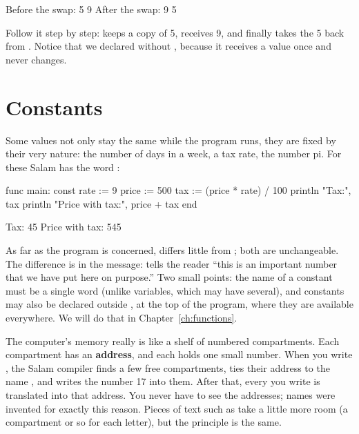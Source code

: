 \begin{salamout}
Before the swap: 5 9
After the swap: 9 5
\end{salamout}

Follow it step by step:  keeps a copy of 5,  receives 9,
and finally  takes the 5 back from . Notice that we
declared  without , because it receives a value once
and never changes.

\section{Constants}

Some values not only stay the same while the program runs, they are fixed by
their very nature: the number of days in a week, a tax rate, the number pi.
For these Salam has the word :

\begin{salamcode}
func main:
    const rate := 9
    price := 500
    tax := (price * rate) / 100
    println "Tax:", tax
    println "Price with tax:", price + tax
end
\end{salamcode}

\begin{salamout}
Tax: 45
Price with tax: 545
\end{salamout}

As far as the program is concerned,  differs little
from ; both are unchangeable. The difference is in the
message:  tells the reader ``this is an important number that
we have put here on purpose.'' Two small points: the name of a constant must
be a single word (unlike variables, which may have several), and constants
may also be declared outside , at the top of the program,
where they are available everywhere. We will do that in Chapter~\ref{ch:functions}.

\begin{deep}
The computer's memory really is like a shelf of numbered compartments. Each
compartment has an \textbf{address}, and each holds one small number. When
you write , the Salam compiler finds a few free
compartments, ties their address to the name , and writes the
number 17 into them. After that, every  you write is translated
into that address. You never have to see the addresses; names were invented
for exactly this reason. Pieces of text such as  take a little
more room (a compartment or so for each letter), but the principle is the
same.
\end{deep}

